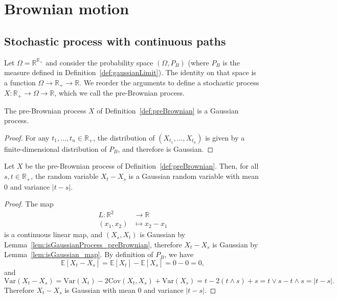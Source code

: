 \chapter{Brownian motion}
\label{chap:brownian}


\section{Stochastic process with continuous paths}

\begin{definition}\label{def:preBrownian}
  \leanok
Let $\Omega = \mathbb{R}^{\mathbb{R}_+}$ and consider the probability space $(\Omega, P_B)$ (where $P_B$ is the measure defined in Definition~\ref{def:gaussianLimit}).
The identity on that space is a function $\Omega \to \mathbb{R}_+ \to \mathbb{R}$.
We reorder the arguments to define a stochastic process $X : \mathbb{R}_+ \to \Omega \to \mathbb{R}$, which we call the pre-Brownian process.
\end{definition}


\begin{lemma}\label{lem:isGaussianProcess_preBrownian}
  \leanok
  The pre-Brownian process $X$ of Definition~\ref{def:preBrownian} is a Gaussian process.
\end{lemma}

\begin{proof}\leanok
For any $t_1, \ldots, t_n \in \mathbb{R}_+$, the distribution of $(X_{t_1}, \ldots, X_{t_n})$ is given by a finite-dimensional distribution of $P_B$, and therefore is Gaussian.
\end{proof}


\begin{lemma}\label{lem:hasLaw_preBrownian_sub}
  \leanok
Let $X$ be the pre-Brownian process of Definition~\ref{def:preBrownian}.
Then, for all $s, t \in \mathbb{R}_+$, the random variable $X_t - X_s$ is a Gaussian random variable with mean $0$ and variance $|t - s|$.
\end{lemma}

\begin{proof}\leanok
The map
\begin{align*}
  L : \mathbb{R}^2 &\to \mathbb{R} \\
  (x_1, x_2) &\mapsto x_2 - x_1
\end{align*}
is a continuous linear map, and $(X_s, X_t)$ is Gaussian by Lemma~\ref{lem:isGaussianProcess_preBrownian}, therefore $X_t - X_s$ is Gaussian by Lemma~\ref{lem:isGaussian_map}. By definition of $P_B$, we have
$$\mathbb{E}[X_t - X_s] = \mathbb{E}[X_t] - \mathbb{E}[X_s] = 0 - 0 = 0,$$
and
$$\mathrm{Var}(X_t - X_s) = \mathrm{Var}(X_t) - 2\mathrm{Cov}(X_t, X_s) + \mathrm{Var}(X_s) = t - 2(t \land s) + s = t \lor s - t \land s = |t - s|.$$
Therefore $X_t - X_s$ is Gaussian with mean $0$ and variance $|t - s|$.
\end{proof}


